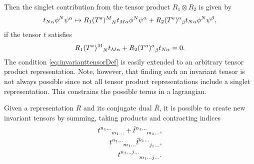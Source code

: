 Then the singlet contribution from the tensor product $R_1\otimes R_2$ is given by 
\begin{equation}
    t_{N\alpha}\phi^N\psi^\alpha \mapsto \tensor{R_1(T^a)}{^M_N}t_{M\alpha}\phi^N\psi^\alpha+\tensor{R_2(T^a)}{^\alpha_\beta}t_{N\alpha}\phi^N\psi^\beta ,
\end{equation}
if the tensor $t$ satisfies
\begin{equation}\label{eq:invarianttensorDef}
    \tensor{R_1(T^a)}{^M_N}t_{M\alpha}+\tensor{R_2(T^a)}{^\alpha_\beta}t_{N\alpha} = 0.
\end{equation}
The condition \eqref{eq:invarianttensorDef} is easily extended to an arbitrary tensor product representation. Note, however, that finding such an invariant tensor is not always possible since not all tensor product representations include a singlet representation. This constrains the possible terms in a lagrangian. 

Given a representation $R$ and its conjugate dual $\overbar{R}$, it is possible to create new invariant tensors by summing, taking products and contracting indices
\begin{equation}
\begin{aligned}
\tensor{t}{^{n_1\ldots}_{m_1\ldots}}+\tensor{\tilde{t}}{^{n_1\ldots}_{m_1\ldots}},\\
\tensor{t}{^{n_1\ldots}_{m_1\ldots}}\tensor{\tilde{t}}{^{k_1\ldots}_{j_1\ldots}},\\
\tensor{t}{^{n_1\ldots j\ldots}_{m_1\ldots j\ldots}}.
\end{aligned}
\end{equation}

